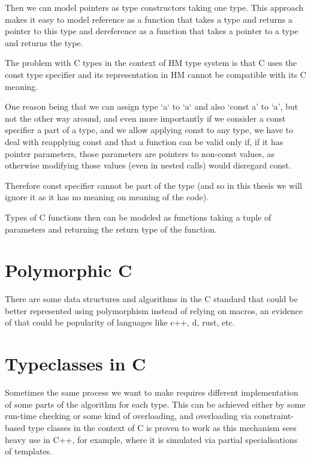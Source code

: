 Then we can model pointers as type constructors taking one type.
This approach makes it easy to model reference as a function that takes a type and returns a pointer to this type
and dereference as a function that takes a pointer to a type and returns the type.

The problem with C types in the context of HM type system is that C uses the const type specifier and its representation
in HM cannot be compatible with its C meaning.

One reason being that we can assign type `a` to `a` and also `const a' to `a', but not the other way around, and even
more importantly if we consider a const specifier a part of a type, and we allow applying const to any type, we have
to deal with reapplying const and that a function can be valid only if, if it has pointer parameters, those parameters
are pointers to non-const values, as otherwise modifying those values (even in nested calls) would disregard const.

Therefore const specifier cannot be part of the type (and so in this thesis we will ignore it as it has no meaning on
meaning of the code).

Types of C functions then can be modeled as functions taking a tuple of parameters and returning the return type of the
function.


\section{Polymorphic C}

There are some data structures and algorithms in the C standard that could be better represented using polymorphism instead of relying on
macros, an evidence of that could be popularity of languages like c++, d, rust, etc.

\section{Typeclasses in C}

Sometimes the same process we want to make requires different implementation of some parts of the algorithm
for each type. This can be achieved either by some run-time checking or some kind of overloading, and overloading via
constraint-based type classes in the context of C is proven to work as this mechanism sees heavy use in C++, for example,
where it is simulated via partial specialisations of templates.




